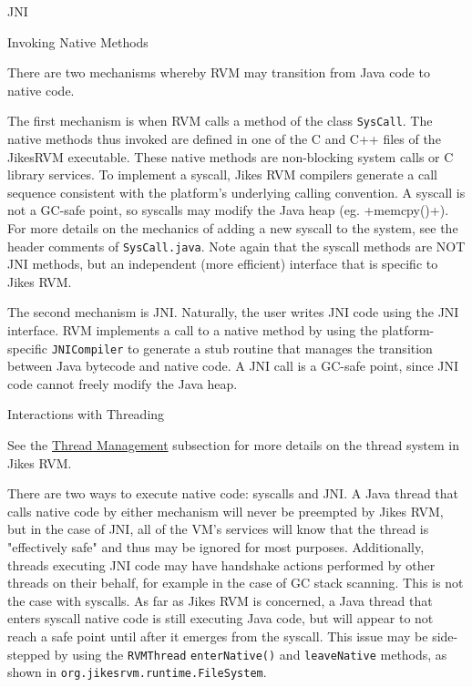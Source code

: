 \begin{section}{JNI}
\begin{subsection}{Invoking Native Methods}

There are two mechanisms whereby RVM may transition from Java code to native code.

The first mechanism is when RVM calls a method of the class \texttt{SysCall}. The native methods thus invoked are defined in one of the C and C++ files of the JikesRVM executable. These native methods are non-blocking system calls or C library services. To implement a syscall, Jikes RVM compilers generate a call sequence consistent with the platform's underlying calling convention. A syscall is not a GC-safe point, so syscalls may modify the Java heap (eg. \spverb+memcpy()+). For more details on the mechanics of adding a new syscall to the system, see the header comments of \texttt{Sys\-Call.java}. Note again that the syscall methods are NOT JNI methods, but an independent (more efficient) interface that is specific to Jikes RVM.

The second mechanism is JNI. Naturally, the user writes JNI code using the JNI interface. RVM implements a call to a native method by using the platform-specific \texttt{JNI\-Com\-pi\-ler} to generate a stub routine that manages the transition between Java bytecode and native code. A JNI call is a GC-safe point, since JNI code cannot freely modify the Java heap.

\end{subsection}

\begin{subsection}{Interactions with Threading}

See the \hyperref[sec:threadmanagement]{Thread Management} subsection for more details on the thread system in Jikes RVM.

There are two ways to execute native code: syscalls and JNI. A Java thread that calls native code by either mechanism will never be preempted by Jikes RVM, but in the case of JNI, all of the VM's services will know that the thread is "effectively safe" and thus may be ignored for most purposes. Additionally, threads executing JNI code may have handshake actions performed by other threads on their behalf, for example in the case of GC stack scanning. This is not the case with syscalls. As far as Jikes RVM is concerned, a Java thread that enters syscall native code is still executing Java code, but will appear to not reach a safe point until after it emerges from the syscall. This issue may be side-stepped by using the \texttt{RVM\-Thread} \texttt{en\-ter\-Na\-ti\-ve()} and \texttt{lea\-ve\-Na\-ti\-ve} methods, as shown in \texttt{org.jikes\-rvm.run\-ti\-me.Fi\-le\-Sys\-tem}.


\end{subsection}
\end{section}
